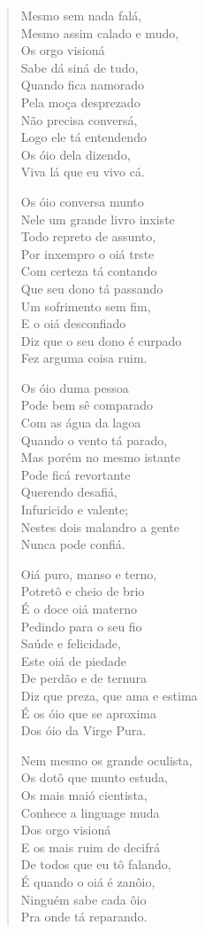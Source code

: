 \begin{verse}
Mesmo sem nada falá,\\
Mesmo assim calado e mudo,\\
Os orgo visioná\\
Sabe dá siná de tudo,\\
Quando fica namorado\\
Pela moça desprezado\\
Não precisa conversá,\\
Logo ele tá entendendo\\
Os óio dela dizendo,\\
Viva lá que eu vivo cá.

Os óio conversa munto\\
Nele um grande livro inxiste\\
Todo repreto de assunto,\\
Por inxempro o oiá trste\\
Com certeza tá contando\\
Que seu dono tá passando\\
Um sofrimento sem fim,\\
E o oiá desconfiado\\
Diz que o seu dono é curpado\\
Fez arguma coisa ruim.

Os óio duma pessoa\\
Pode bem sê comparado\\
Com as água da lagoa\\
Quando o vento tá parado,\\
Mas porém no mesmo istante\\
Pode ficá revortante\\
Querendo desafiá,\\
Infuricido e valente;\\
Nestes dois malandro a gente\\
Nunca pode confiá.

Oiá puro, manso e terno,\\
Potretô e cheio de brio\\
É o doce oiá materno\\
Pedindo para o seu fio\\
Saúde e felicidade,\\
Este oiá de piedade\\
De perdão e de ternura\\
Diz que preza, que ama e estima\\
É os óio que se aproxima\\
Dos óio da Virge Pura.

Nem mesmo os grande oculista,\\
Os dotô que munto estuda,\\
Os mais maió cientista,\\
Conhece a linguage muda\\
Dos orgo visioná\\
E os mais ruim de decifrá\\
De todos que eu tô falando,\\
É quando o oiá é zanôio,\\
Ninguém sabe cada ôio\\
Pra onde tá reparando.
\end{verse}

